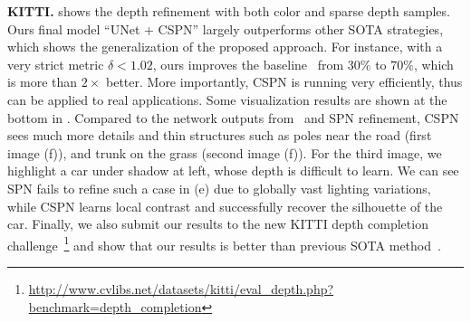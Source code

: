 \noindent\textbf{KITTI.}  shows the depth refinement with both color and sparse depth samples. Ours final model ``UNet + CSPN'' largely outperforms other SOTA strategies, which shows the generalization of the proposed approach. For instance, with a very strict metric $\delta < 1.02$, ours improves the baseline~\cite{Ma2017SparseToDense} from $30\%$ to $70\%$, which is more than $2\times$ better. More importantly, CSPN is running very efficiently, thus can be applied to real applications.
Some visualization results are shown at the bottom in . Compared to the network outputs from~\cite{Ma2017SparseToDense} and SPN refinement, CSPN sees much more details and thin structures such as poles near the road (first image (f)), and trunk on the grass (second image (f)). For the third image, we highlight a car under shadow at left, whose depth is difficult to learn. We can see SPN fails to refine such a case in (e) due to globally vast lighting variations, while CSPN learns local contrast and successfully recover the silhouette of the car. Finally, we also submit our results to the new KITTI depth completion challenge~\footnote{\url{http://www.cvlibs.net/datasets/kitti/eval_depth.php?benchmark=depth_completion}} and show that our results is better than previous SOTA method~\cite{uhrig2017sparsity}. 


